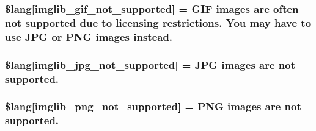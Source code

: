 \subsubsection[{\$lang}]{\setlength{\rightskip}{0pt plus 5cm}\$lang\mbox{[}\textquotesingle{}imglib\+\_\+gif\+\_\+not\+\_\+supported\textquotesingle{}\mbox{]} = \textquotesingle{}G\+I\+F images are often not supported due to licensing restrictions. You may have to use J\+P\+G or P\+N\+G images instead.\textquotesingle{}}\label{_admin_2system_2language_2english_2imglib__lang_8php_a235a59a6660145fc136b3933b5b10675}
\hypertarget{_admin_2system_2language_2english_2imglib__lang_8php_a4acdc927c172bab1370b2897c667c552}{}
\subsubsection[{\$lang}]{\setlength{\rightskip}{0pt plus 5cm}\$lang\mbox{[}\textquotesingle{}imglib\+\_\+jpg\+\_\+not\+\_\+supported\textquotesingle{}\mbox{]} = \textquotesingle{}J\+P\+G images are not supported.\textquotesingle{}}\label{_admin_2system_2language_2english_2imglib__lang_8php_a4acdc927c172bab1370b2897c667c552}
\hypertarget{_admin_2system_2language_2english_2imglib__lang_8php_a0b7ea2e2fbd03eb72fe9d969adb643dd}{}
\subsubsection[{\$lang}]{\setlength{\rightskip}{0pt plus 5cm}\$lang\mbox{[}\textquotesingle{}imglib\+\_\+png\+\_\+not\+\_\+supported\textquotesingle{}\mbox{]} = \textquotesingle{}P\+N\+G images are not supported.\textquotesingle{}}\label{_admin_2system_2language_2english_2imglib__lang_8php_a0b7ea2e2fbd03eb72fe9d969adb643dd}
\hypertarget{_admin_2system_2language_2english_2imglib__lang_8php_a2878e2b878871cd8010970f865d70e71}{}
